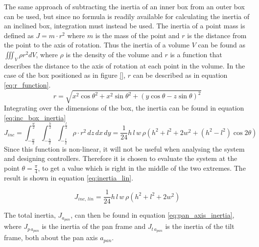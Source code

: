 \documentclass[../../main.tex]{subfiles}
\begin{document}
The same approach of subtracting the inertia of an inner box from an outer box can be used, but since no formula is readily available for calculating the inertia of an inclined box, integration must instead be used. The inertia of a point mass is defined as $J=m\cdot r^2$ \cite{PrincipalsOfPhysics} where $m$ is the mass of the point and $r$ is the distance from the point to the axis of rotation. Thus the inertia of a volume $V$ can be found as $\iiint_V \rho r^2 dV$, where $\rho$ is the density of the volume and $r$ is a function that describes the distance to the axis of rotation at each point in the volume. In the case of the box positioned as in figure \ref{}, $r$ can be described as in equation \ref{eq:r_function}.
\begin{equation}\label{eq:r_function}
    r = \sqrt{x^2\cos{\theta}^2+x^2\sin{\theta}^2+(y\cos{\theta}-z\sin{\theta})^2}
\end{equation}
Integrating over the dimensions of the box, the inertia can be found in equation \ref{eq:inc_box_inertia}
\begin{equation}\label{eq:inc_box_inertia}
    J_{inc} = \int_{-\frac{w}{2}}^{\frac{w}{2}}
        \int_{-\frac{h}{2}}^{\frac{h}{2}}
        \int_{-\frac{l}{2}}^{\frac{l}{2}}
        \rho \cdot r^2 \,dz \,dx \,dy = \frac{1}{24}h\,l\,w\, \rho (h^2+l^2+2w^2+(h^2-l^2)\cos{2\theta})
\end{equation}
Since this function is non-linear, it will not be useful when analysing the system and designing controllers. Therefore it is chosen to evaluate the system at the point $\theta = \frac{\pi}{4}$, to get a value which is right in the middle of the two extremes. The result is shown in equation \ref{eq:inertia_lin}.

\begin{equation}\label{eq:inertia_lin}
    J_{inc,\,lin} = \frac{1}{24}h\,l\,w\, \rho (h^2+l^2+2w^2)
\end{equation}

The total inertia, $J_{a_{pan}}$, can then be found in equation \ref{eq:pan_axis_inertia}, where $J_{p\,a_{pan}}$ is the inertia of the pan frame and $J_{t\,a_{pan}}$ is the inertia of the tilt frame, both about the pan axis $a_{pan}$.
\end{document}
